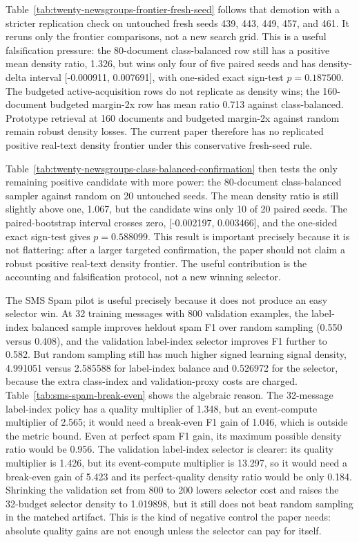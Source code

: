 \documentclass[11pt]{article}
\begin{document}
Table~\ref{tab:twenty-newsgroups-frontier-fresh-seed} follows that demotion
with a stricter replication check on untouched fresh seeds 439, 443, 449, 457,
and 461. It reruns only the frontier comparisons, not a new search grid. This
is a useful falsification pressure: the 80-document class-balanced row still
has a positive mean density ratio, 1.326, but wins only four of five paired
seeds and has density-delta interval [-0.000911, 0.007691], with one-sided
exact sign-test \(p=0.187500\). The budgeted active-acquisition rows do not
replicate as density wins; the 160-document budgeted margin-2x row has mean
ratio 0.713 against class-balanced. Prototype retrieval at 160 documents and
budgeted margin-2x against random remain robust density losses. The current
paper therefore has no replicated positive real-text density frontier under
this conservative fresh-seed rule.

Table~\ref{tab:twenty-newsgroups-class-balanced-confirmation} then tests the
only remaining positive candidate with more power: the 80-document
class-balanced sampler against random on 20 untouched seeds. The mean density
ratio is still slightly above one, 1.067, but the candidate wins only 10 of 20
paired seeds. The paired-bootstrap interval crosses zero, [-0.002197,
0.003466], and the one-sided exact sign-test gives \(p=0.588099\). This result
is important precisely because it is not flattering: after a larger targeted
confirmation, the paper should not claim a robust positive real-text density
frontier. The useful contribution is the accounting and falsification protocol,
not a new winning selector.

The SMS Spam pilot is useful precisely because it does not produce an easy
selector win. At 32 training messages with 800 validation examples, the
label-index balanced sample improves heldout spam F1 over random sampling
(0.550 versus 0.408), and the validation label-index selector improves F1
further to 0.582. But random sampling still has much higher signed learning
signal density, 4.991051 versus 2.585588 for label-index balance and 0.526972
for the selector, because the extra class-index and validation-proxy costs are
charged. Table~\ref{tab:sms-spam-break-even} shows the algebraic reason. The
32-message label-index policy has a quality multiplier of 1.348, but an
event-compute multiplier of 2.565; it would need a break-even F1 gain of 1.046,
which is outside the metric bound. Even at perfect spam F1 gain, its maximum
possible density ratio would be 0.956. The validation label-index selector is
clearer: its quality multiplier is 1.426, but its event-compute multiplier is
13.297, so it would need a break-even gain of 5.423 and its perfect-quality
density ratio would be only 0.184. Shrinking the validation set from 800 to 200
lowers selector cost and raises the 32-budget selector density to 1.019898, but
it still does not beat random sampling in the matched artifact. This is the kind
of negative control the paper needs: absolute quality gains are not enough
unless the selector can pay for itself.
\end{document}

